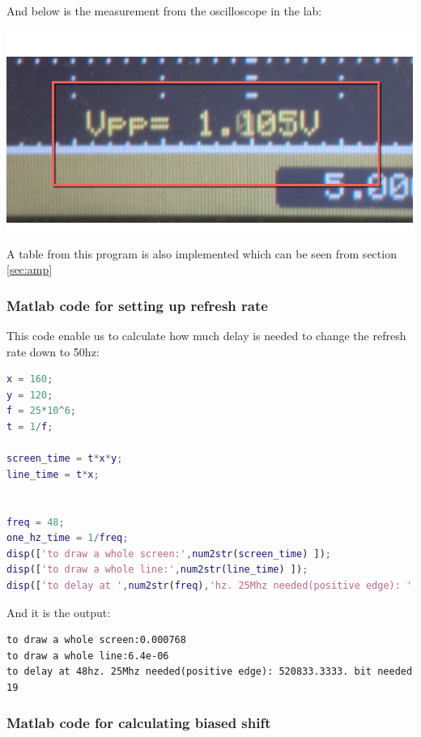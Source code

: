 \documentclass[11pt]{scrartcl}
\begin{document}
And below is the measurement from the oscilloscope in the lab:
\begin{center}     
\begin{minipage}[t]{\linewidth}


\includegraphics[scale = 0.4]{vpp.png}
\end{minipage}
\medskip
\end{center}

A table from this program is also implemented which can be seen from section \ref{sec:amp}

\subsubsection{Matlab code for setting up refresh rate}
\label{sec:refresh}
This code enable us to calculate how much delay is needed to change the refresh rate down to 50hz:
\begin{lstlisting}[language=Matlab]
x = 160;
y = 120;
f = 25*10^6;
t = 1/f;

screen_time = t*x*y;
line_time = t*x;


freq = 48;
one_hz_time = 1/freq;
disp(['to draw a whole screen:',num2str(screen_time) ]);
disp(['to draw a whole line:',num2str(line_time) ]);
disp(['to delay at ',num2str(freq),'hz. 25Mhz needed(positive edge): ',num2str(one_hz_time/t),'. bit needed ',num2str(ceil(log2(one_hz_time/t)))]);
\end{lstlisting}

And it is the output:
\begin{verbatim}
to draw a whole screen:0.000768
to draw a whole line:6.4e-06
to delay at 48hz. 25Mhz needed(positive edge): 520833.3333. bit needed 19
\end{verbatim}

\subsubsection{Matlab code for calculating biased shift}
\end{document}
